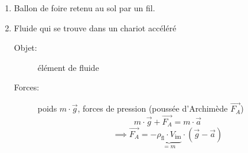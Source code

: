 \documentclass[
    11pt,
    a4paper,
    oneside,
    headinlcude, footinclude,
    twoside,
]{report}
\renewcommand{\vec}[1]{\overrightarrow{#1}}
\begin{document}
\begin{enumerate}
    \item Ballon de foire retenu au sol par un fil.

        \begin{center}
            \begin{minipage}{.4\linewidth}
            \end{minipage}
            \begin{minipage}{.59\linewidth}
                \setlength{\parskip}{.3em}
            \end{minipage}
        \end{center}

    \item Fluide qui se trouve dans un chariot acc\'el\'er\'e

        \begin{center}
            \begin{minipage}{.5\linewidth}
            \end{minipage}
            \begin{minipage}{.49\linewidth}
                \setlength{\parskip}{.3em}
                \begin{description}
                    \item[Objet:] \'el\'ement de fluide 
                    \item[Forces:] poids $m\cdot \vec g$, forces de pression (pouss\'ee
                        d'Archim\`ede $\vec{F_{A}}$)
                        \begin{equation}
                            m \cdot \vec g + \vec{F_{A}} = m\cdot \vec a 
                        \end{equation}
                        $$\implies \vec{F_{A}} = - \underbrace{\rho_{\text{fl}} \cdot V_{\text{im}}}_{=m}
                        \cdot (\vec g - \vec a)$$


\end{description}
\end{minipage}
\end{center}
\end{enumerate}
\end{document}
